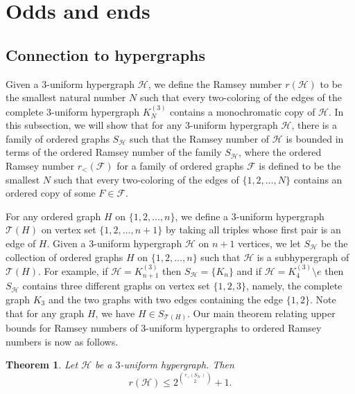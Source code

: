 \documentclass[11pt]{article}
\newtheorem{theorem}{Theorem}[section]
\newcommand{\rord}{r_{<}}
\begin{document}
\section{Odds and ends} \label{sec:conclusion1}

\subsection{Connection to hypergraphs} \label{sec:hyper}

Given a $3$-uniform hypergraph $\mathcal{H}$, we define the Ramsey number $r(\mathcal{H})$ to be the smallest natural number $N$ such that every two-coloring of the edges of the complete $3$-uniform hypergraph $K_N^{(3)}$ contains a monochromatic copy of $\mathcal{H}$. In this subsection, we will show that for any $3$-uniform hypergraph $\mathcal{H}$, there is a family of ordered graphs $S_\mathcal{H}$ such that the Ramsey number of $\mathcal{H}$ is bounded in terms of the ordered Ramsey number of the family $S_\mathcal{H}$, where the ordered Ramsey number $\rord(\mathcal{F})$ for a family of ordered graphs $\mathcal{F}$ is defined to be the smallest $N$ such that every two-coloring of the edges of $\{1, 2, \dots, N\}$ contains an ordered copy of some $F \in \mathcal{F}$.

For any ordered graph $H$ on $\{1, 2, \dots, n\}$, we define a $3$-uniform hypergraph $\mathcal{T}(H)$ on vertex set $\{1, 2, \dots, n+1\}$ by taking all triples whose first pair is an edge of $H$. Given a $3$-uniform hypergraph $\mathcal{H}$ on $n + 1$ vertices, we let $S_\mathcal{H}$ be the collection of ordered graphs $H$ on $\{1, 2, \dots, n\}$ such that $\mathcal{H}$ is a subhypergraph of $\mathcal{T}(H)$. For example, if $\mathcal{H} = K_{n+1}^{(3)}$ then $S_\mathcal{H} = \{K_n\}$ and if $\mathcal{H} = K_{4}^{(3)}\setminus e$ then $S_\mathcal{H}$ contains three different graphs on vertex set $\{1, 2, 3\}$, namely, the complete graph $K_3$ and the two graphs with two edges containing the edge $\{1, 2\}$. Note that for any graph $H$, we have $H \in S_{\mathcal{T}(H)}$. Our main theorem relating upper bounds for Ramsey numbers of $3$-uniform hypergraphs to ordered Ramsey numbers is now as follows. 

\begin{theorem} \label{thm:hyper}
Let $\mathcal{H}$ be a $3$-uniform hypergraph. Then
\[r(\mathcal{H}) \leq 2^{\binom{\rord(S_\mathcal{H})}{2}}+1.\] 
\end{theorem}
\end{document}
